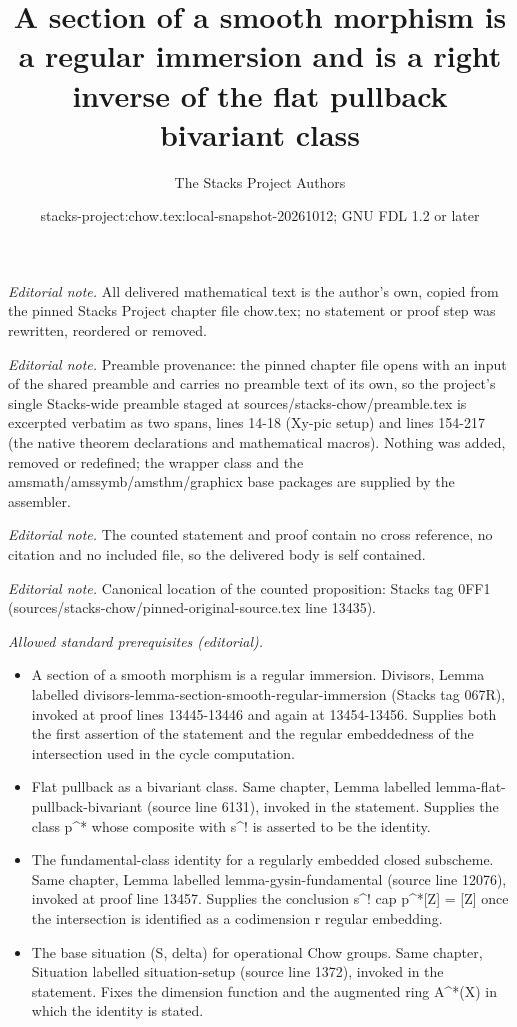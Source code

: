 \documentclass[10pt,a4paper]{amsart}
\title{A section of a smooth morphism is a regular immersion and is a right inverse of the flat pullback bivariant class}
\author{The Stacks Project Authors}
\date{stacks-project:chow.tex:local-snapshot-20261012; GNU FDL 1.2 or later}
\theoremstyle{plain}
\theoremstyle{definition}
\theoremstyle{remark}
\numberwithin{equation}{subsection}
\begin{document}
\maketitle
\noindent\textit{Editorial note.} All delivered mathematical text is the author's own, copied from the pinned Stacks Project chapter file chow.tex; no statement or proof step was rewritten, reordered or removed.\par\medskip
\noindent\textit{Editorial note.} Preamble provenance: the pinned chapter file opens with an input of the shared preamble and carries no preamble text of its own, so the project's single Stacks-wide preamble staged at sources/stacks-chow/preamble.tex is excerpted verbatim as two spans, lines 14-18 (Xy-pic setup) and lines 154-217 (the native theorem declarations and mathematical macros). Nothing was added, removed or redefined; the wrapper class and the amsmath/amssymb/amsthm/graphicx base packages are supplied by the assembler.\par\medskip
\noindent\textit{Editorial note.} The counted statement and proof contain no cross reference, no citation and no included file, so the delivered body is self contained.\par\medskip
\noindent\textit{Editorial note.} Canonical location of the counted proposition: Stacks tag 0FF1 (sources/stacks-chow/pinned-original-source.tex line 13435).\par\medskip
\noindent\textit{Allowed standard prerequisites (editorial).}\begin{itemize}
\item A section of a smooth morphism is a regular immersion. Divisors, Lemma labelled divisors-lemma-section-smooth-regular-immersion (Stacks tag 067R), invoked at proof lines 13445-13446 and again at 13454-13456. Supplies both the first assertion of the statement and the regular embeddedness of the intersection used in the cycle computation.
\item Flat pullback as a bivariant class. Same chapter, Lemma labelled lemma-flat-pullback-bivariant (source line 6131), invoked in the statement. Supplies the class p\textasciicircum{}* whose composite with s\textasciicircum{}! is asserted to be the identity.
\item The fundamental-class identity for a regularly embedded closed subscheme. Same chapter, Lemma labelled lemma-gysin-fundamental (source line 12076), invoked at proof line 13457. Supplies the conclusion s\textasciicircum{}! cap p\textasciicircum{}*[Z] = [Z] once the intersection is identified as a codimension r regular embedding.
\item The base situation (S, delta) for operational Chow groups. Same chapter, Situation labelled situation-setup (source line 1372), invoked in the statement. Fixes the dimension function and the augmented ring A\textasciicircum{}*(X) in which the identity is stated.
\end{itemize}\medskip
\end{document}
